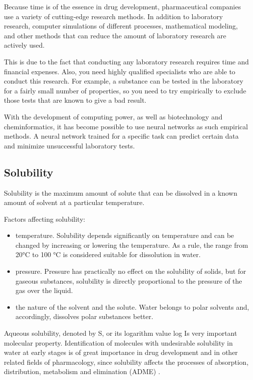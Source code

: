 \documentclass[a4paper,14pt]{article}
\begin{document}
Because time is of the essence in drug development, pharmaceutical companies use a variety of cutting-edge research methods. In addition to laboratory research, computer simulations of different processes, mathematical modeling, and other methods that can reduce the amount of laboratory research are actively used. 


This is due to the fact that conducting any laboratory research requires time and financial expenses. Also, you need highly qualified specialists who are able to conduct this research. For example, a substance can be tested in the laboratory for a fairly small number of properties, so you need to try empirically to exclude those tests that are known to give a bad result.

With the development of computing power, as well as biotechnology and cheminformatics, it has become possible to use neural networks as such empirical methods. A neural network trained for a specific task can predict certain data and minimize unsuccessful laboratory tests.

\subsection{Solubility}\label{2}
Solubility is the maximum amount of solute that can be dissolved in a known amount of solvent at a particular temperature.

Factors affecting solubility:
\begin {itemize}
\item {temperature. Solubility depends significantly on temperature and can be changed by increasing or lowering the temperature. As a rule, the range from 20°C to 100 °C is considered suitable for dissolution in water.}

\item{pressure. Pressure has practically no effect on the solubility of solids, but for gaseous substances, solubility is directly proportional to the pressure of the gas over the liquid.}

\item{the nature of the solvent and the solute. Water belongs to polar solvents and, accordingly, dissolves polar substances better.}
\end {itemize}

Aqueous solubility, denoted by S, or its logarithm value log Is very important molecular property. Identification of
molecules with undesirable solubility in water at early stages is of great importance in drug development and in other related fields of pharmacology, since solubility affects the processes of absorption, distribution, metabolism and elimination (ADME) \cite{ADME}.
\end{document}
